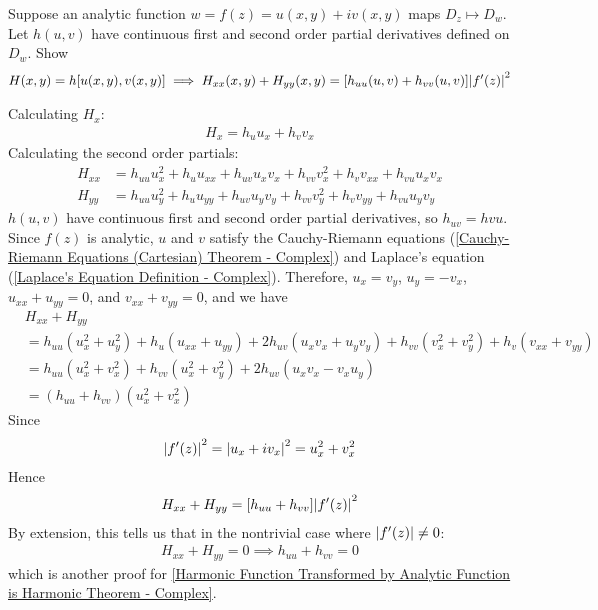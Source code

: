 \documentclass[12pt, english]{book}
\makeatletter
\renewenvironment{proof}[1][\proofname]{\par
	\pushQED{\qed}%
	\normalfont \topsep6\p@\@plus6\p@\relax
	\list{}{%
		\settowidth{\leftmargin}{\itshape\proofname:\hskip\labelsep}%
		\setlength{\labelwidth}{0pt}%
		\setlength{\itemindent}{-\leftmargin}%
		}%
	\item[\hskip\labelsep\itshape#1\@addpunct{:}]\ignorespaces
	}{\popQED\endlist\@endpefalse}
\makeatother
\begin{document}
	\begin{example}
		\label{Harmonic Function Transformed by Analytic Function is Harmonic Theorem Alternate Proof Example - Complex}
		Suppose an analytic function \(w = f(z) = u(x,y) + iv(x,y)\) maps \(D_z \mapsto D_w\). Let \(h(u,v)\) have continuous first and second order partial derivatives defined on \(D_w\). Show
		\begin{align*}
			H(x,y) = h[u(x,y), v(x,y)] 
			\implies H_{xx}(x,y) + H_{yy}(x,y) = [h_{uu}(u,v) + h_{vv}(u,v)] \abs{f'(z)}^2
		\end{align*}
		\begin{proof}
			{\color{Grey}
			Calculating \(H_x\):
			\begin{align*}
				H_x = h_u u_x + h_v v_x
			\end{align*}
			Calculating the second order partials:
			\begin{align*}
				H_{xx} 
				&= h_{uu} u_x^2 + h_u u_{xx} + h_{uv} u_x v_x + h_{vv} v_x^2 + h_v v_{xx} + h_{vu} u_x v_x \\
				H_{yy}
				&= h_{uu} u_y^2 + h_u u_{yy} + h_{uv} u_y v_y + h_{vv} v_y^2 + h_v v_{yy} + h_{vu} u_y v_y
			\end{align*}
			\(h(u,v)\) have continuous first and second order partial derivatives, so \(h_{uv} = h{vu}\). Since \(f(z)\) is analytic, \(u\) and \(v\) satisfy the Cauchy-Riemann equations (\cref{Cauchy-Riemann Equations (Cartesian) Theorem - Complex}) and Laplace's equation (\cref{Laplace's Equation Definition - Complex}). Therefore, \(u_x = v_y\), \(u_y = -v_x\), \(u_{xx} + u_{yy} = 0\), and \(v_{xx} + v_{yy} = 0\), and we have
			\begin{align*}
				&H_{xx} + H_{yy} \\
				&= h_{uu} (u_x^2 + u_y^2) + h_u (u_{xx} + u_{yy}) + 2h_{uv} (u_x v_x + u_y v_y) + h_{vv} (v_x^2 + v_y^2) + h_v (v_{xx} + v_{yy}) \\
				&= h_{uu} (u_x^2 + v_x^2) + h_{vv} (u_x^2 + v_y^2) + 2h_{uv}(u_x v_x - v_x u_y) \\
				&= (h_{uu} + h_{vv})(u_x^2 + v_x^2)
			\end{align*}
			Since
			\begin{align*}
				\abs{f'(z)}^2 = \abs{u_x + iv_x}^2 = u_x^2 + v_x^2
			\end{align*}
			Hence
			\begin{align*}
				H_{xx} + H_{yy} = [h_{uu} + h_{vv}] \abs{f'(z)}^2
			\end{align*}
			By extension, this tells us that in the nontrivial case where \(\abs{f'(z)} \neq 0\):
			\begin{align*}
				H_{xx} + H_{yy} = 0 \implies h_{uu} + h_{vv} = 0
			\end{align*}
			which is another proof for \cref{Harmonic Function Transformed by Analytic Function is Harmonic Theorem - Complex}.
			}
		\end{proof}
	\end{example}
\end{document}
